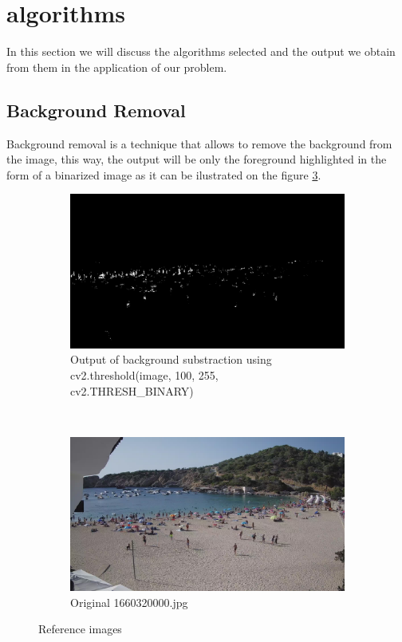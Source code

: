 \documentclass[11pt]{article}
\begin{document}
\section{algorithms}
In this section we will discuss the algorithms selected and the output we obtain from them in the application of our problem.

\subsection{Background Removal} 
Background removal is a technique that allows to remove the background from the image, this way, the output will be only the foreground highlighted in the form of a binarized image as it can be ilustrated on the figure \ref{fig: img_reference}. 

\begin{figure}[h]
    \begin{subfigure}[t]{0.5\textwidth}
        \centering
        \includegraphics[width=\textwidth]{img/bin_ex.jpg}
        \caption{Output of background substraction using cv2.threshold(image, 100, 255, cv2.THRESH\_BINARY)}
        \label{fig:y equals x}
    \end{subfigure}
    ~
    \begin{subfigure}[t]{0.5\textwidth}
        \centering
        \includegraphics[width=\textwidth]{img/or_ex.jpg}
        \caption{Original 1660320000.jpg}
        \label{fig:y equals x}
    \end{subfigure}

    \caption{Reference images}
    \label{fig: img_reference}
\end{figure}
\end{document}
